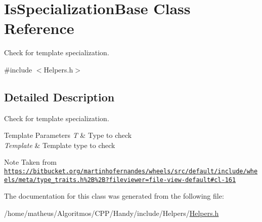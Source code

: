\hypertarget{classIsSpecializationBase}{}\section{Is\+Specialization\+Base Class Reference}
\label{classIsSpecializationBase}


Check for template specialization.  




{\ttfamily \#include $<$Helpers.\+h$>$}



\subsection{Detailed Description}
Check for template specialization. 


\begin{DoxyTemplParams}{Template Parameters}
{\em T} & Type to check \\
\hline
{\em Template} & Template type to check \\
\hline
\end{DoxyTemplParams}
\begin{DoxyNote}{Note}
Taken from \href{https://bitbucket.org/martinhofernandes/wheels/src/default/include/wheels/meta/type_traits.h%2B%2B?fileviewer=file-view-default#cl-161}{\tt https\+://bitbucket.\+org/martinhofernandes/wheels/src/default/include/wheels/meta/type\+\_\+traits.\+h\%2\+B\%2\+B?fileviewer=file-\/view-\/default\#cl-\/161} 
\end{DoxyNote}


The documentation for this class was generated from the following file\+:\begin{DoxyCompactItemize}
\item 
/home/matheus/\+Algoritmos/\+C\+P\+P/\+Handy/include/\+Helpers/\hyperlink{Helpers_2Helpers_8h}{Helpers.\+h}\end{DoxyCompactItemize}
